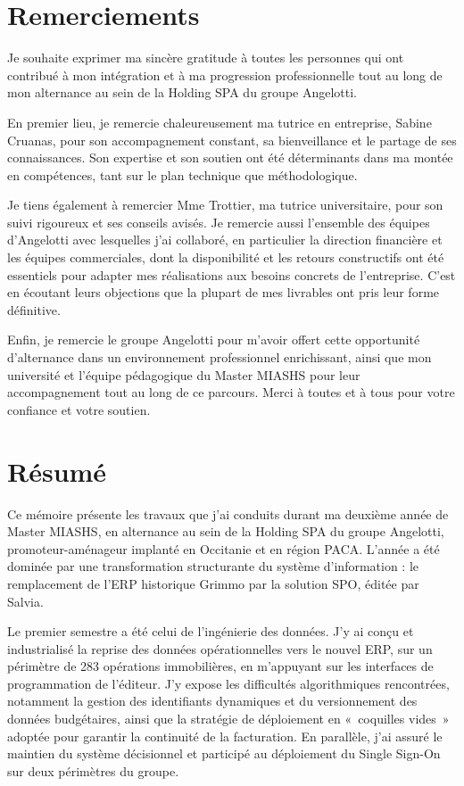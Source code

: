 
\section*{Remerciements}
Je souhaite exprimer ma sincère gratitude à toutes les personnes qui ont contribué à mon
intégration et à ma progression professionnelle tout au long de mon alternance au sein de la
Holding SPA du groupe Angelotti.

En premier lieu, je remercie chaleureusement ma tutrice en entreprise, Sabine Cruanas, pour
son accompagnement constant, sa bienveillance et le partage de ses connaissances. Son
expertise et son soutien ont été déterminants dans ma montée en compétences, tant sur le
plan technique que méthodologique.

Je tiens également à remercier Mme Trottier, ma tutrice universitaire, pour son suivi
rigoureux et ses conseils avisés. Je remercie aussi l'ensemble des équipes d'Angelotti avec
lesquelles j'ai collaboré, en particulier la direction financière et les équipes
commerciales, dont la disponibilité et les retours constructifs ont été essentiels pour
adapter mes réalisations aux besoins concrets de l'entreprise. C'est en écoutant leurs
objections que la plupart de mes livrables ont pris leur forme définitive.

Enfin, je remercie le groupe Angelotti pour m'avoir offert cette opportunité d'alternance
dans un environnement professionnel enrichissant, ainsi que mon université et l'équipe
pédagogique du Master MIASHS pour leur accompagnement tout au long de ce parcours. Merci à
toutes et à tous pour votre confiance et votre soutien.

\clearpage
\section*{Résumé}
Ce mémoire présente les travaux que j'ai conduits durant ma deuxième année de Master MIASHS,
en alternance au sein de la Holding SPA du groupe Angelotti, promoteur-aménageur implanté en
Occitanie et en région PACA. L'année a été dominée par une transformation structurante du
système d'information : le remplacement de l'ERP historique Grimmo par la solution SPO,
éditée par Salvia.

Le premier semestre a été celui de l'ingénierie des données. J'y ai conçu et industrialisé
la reprise des données opérationnelles vers le nouvel ERP, sur un périmètre de 283
opérations immobilières, en m'appuyant sur les interfaces de programmation de l'éditeur. J'y
expose les difficultés algorithmiques rencontrées, notamment la gestion des identifiants
dynamiques et du versionnement des données budgétaires, ainsi que la stratégie de
déploiement en «~coquilles vides~» adoptée pour garantir la continuité de la facturation. En
parallèle, j'ai assuré le maintien du système décisionnel et participé au déploiement du
Single Sign-On sur deux périmètres du groupe.

